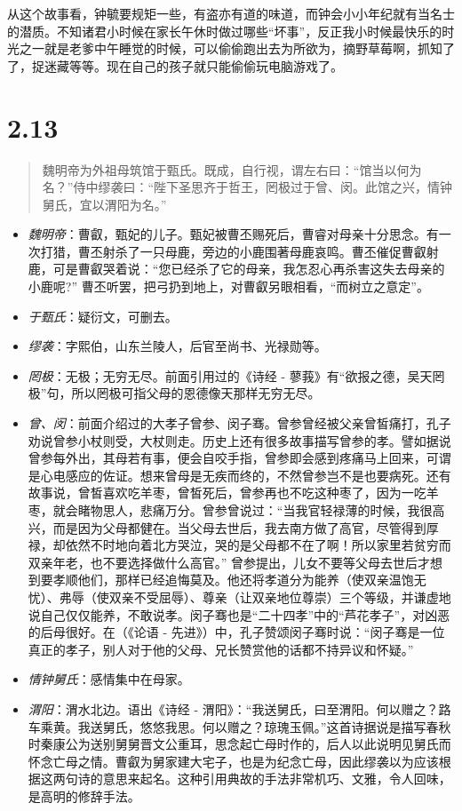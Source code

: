 \documentclass[]{book}
\providecommand{\tightlist}{%
  \setlength{\itemsep}{0pt}\setlength{\parskip}{0pt}}
\begin{document}
从这个故事看，钟毓要规矩一些，有盗亦有道的味道，而钟会小小年纪就有当名士的潜质。不知诸君小时候在家长午休时做过哪些``坏事''，反正我小时候最快乐的时光之一就是老爹中午睡觉的时候，可以偷偷跑出去为所欲为，摘野草莓啊，抓知了了，捉迷藏等等。现在自己的孩子就只能偷偷玩电脑游戏了。

\section{2.13}\label{section-59}

\begin{quote}
魏明帝为外祖母筑馆于甄氏。既成，自行视，谓左右曰：``馆当以何为名？''侍中缪袭曰：``陛下圣思齐于哲王，罔极过于曾、闵。此馆之兴，情钟舅氏，宜以渭阳为名。''
\end{quote}

\begin{itemize}
\tightlist
\item
  \emph{魏明帝}：曹叡，甄妃的儿子。甄妃被曹丕赐死后，曹睿对母亲十分思念。有一次打猎，曹丕射杀了一只母鹿，旁边的小鹿围著母鹿哀鸣。曹丕催促曹叡射鹿，可是曹叡哭着说：``您已经杀了它的母亲，我怎忍心再杀害这失去母亲的小鹿呢?''
  曹丕听罢，把弓扔到地上，对曹叡另眼相看，``而树立之意定''。
\item
  \emph{于甄氏}：疑衍文，可删去。
\item
  \emph{缪袭}：字熙伯，山东兰陵人，后官至尚书、光禄勋等。
\item
  \emph{罔极}：无极；无穷无尽。前面引用过的《诗经 -
  蓼莪》有``欲报之德，吴天罔极''句，所以罔极可指父母的恩德像天那样无穷无尽。
\item
  \emph{曾、闵}：前面介绍过的大孝子曾参、闵子骞。曾参曾经被父亲曾皙痛打，孔子劝说曾参小杖则受，大杖则走。历史上还有很多故事描写曾参的孝。譬如据说曾参每外出，其母若有事，便会自咬手指，曾参即会感到疼痛马上回来，可谓是心电感应的佐证。想来曾母是无疾而终的，不然曾参岂不是也要病死。还有故事说，曾皙喜欢吃羊枣，曾皙死后，曾参再也不吃这种枣了，因为一吃羊枣，就会睹物思人，悲痛万分。曾参曾说过：``当我官轻禄薄的时候，我很高兴，而是因为父母都健在。当父母去世后，我去南方做了高官，尽管得到厚禄，却依然不时地向着北方哭泣，哭的是父母都不在了啊！所以家里若贫穷而双亲年老，也不要选择做什么高官。''
  曾参提出，儿女不要等父母去世后才想到要孝顺他们，那样已经追悔莫及。他还将孝道分为能养（使双亲温饱无忧）、弗辱（使双亲不受屈辱）、尊亲（让双亲地位尊崇）三个等级，并谦虚地说自己仅仅能养，不敢说孝。闵子骞也是``二十四孝''中的``芦花孝子''，对凶恶的后母很好。在（《论语
  -
  先进》）中，孔子赞颂闵子骞时说：``闵子骞是一位真正的孝子，别人对于他的父母、兄长赞赏他的话都不持异议和怀疑。''
\item
  \emph{情钟舅氏}：感情集中在母家。
\item
  \emph{渭阳}：渭水北边。语出《诗经 -
  渭阳》：``我送舅氏，曰至渭阳。何以赠之？路车乘黄。我送舅氏，悠悠我思。何以赠之？琼瑰玉佩。''这首诗据说是描写春秋时秦康公为送别舅舅晋文公重耳，思念起亡母时作的，后人以此说明见舅氏而怀念亡母之情。曹叡为舅家建大宅子，也是为纪念亡母，因此缪袭以为应该根据这两句诗的意思来起名。这种引用典故的手法非常机巧、文雅，令人回味，是高明的修辞手法。
\end{itemize}
\end{document}
